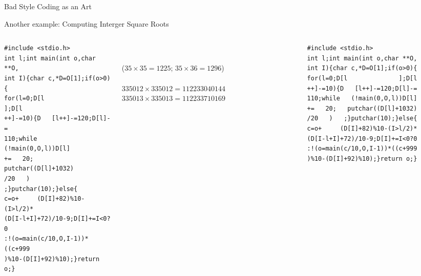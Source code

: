 \begin{frame}[fragile,t]{Bad Style Coding as an Art}
  \begin{block}{Another example: Computing Interger Square Roots}
    \medskip
    \begin{columns}
      \begin{column}{.3\linewidth}        
    \begin{Verbatim}[fontsize=\scriptsize]
#include <stdio.h>
int l;int main(int o,char **O,
int I){char c,*D=O[1];if(o>0){
for(l=0;D[l              ];D[l
++]-=10){D   [l++]-=120;D[l]-=
110;while   (!main(0,O,l))D[l]
+=   20;   putchar((D[l]+1032)
/20   )   ;}putchar(10);}else{
c=o+     (D[I]+82)%10-(I>l/2)*
(D[I-l+I]+72)/10-9;D[I]+=I<0?0
:!(o=main(c/10,O,I-1))*((c+999
)%10-(D[I]+92)%10);}return o;}     
    \end{Verbatim}
      \end{column}
      \begin{column}{.32\linewidth}        
        \\
        \\
{\scriptsize($35\times 35=1225$; $35\times 36=1296$)}\\
\medskip{}\\
{\scriptsize$335012\times 335012=112233040144$
$335013\times 335013=112233710169$
}
      \end{column}
      \begin{column}{.25\linewidth}

        \begin{Verbatim}[fontsize=\tiny]
#include <stdio.h>
int l;int main(int o,char **O,
int I){char c,*D=O[1];if(o>0){
for(l=0;D[l              ];D[l
++]-=10){D   [l++]-=120;D[l]-=
110;while   (!main(0,O,l))D[l]
+=   20;   putchar((D[l]+1032)
/20   )   ;}putchar(10);}else{
c=o+     (D[I]+82)%10-(I>l/2)*
(D[I-l+I]+72)/10-9;D[I]+=I<0?0
:!(o=main(c/10,O,I-1))*((c+999
)%10-(D[I]+92)%10);}return o;}               
        \end{Verbatim}
      \end{column}
    \end{columns}
  \end{block}

\end{frame}
